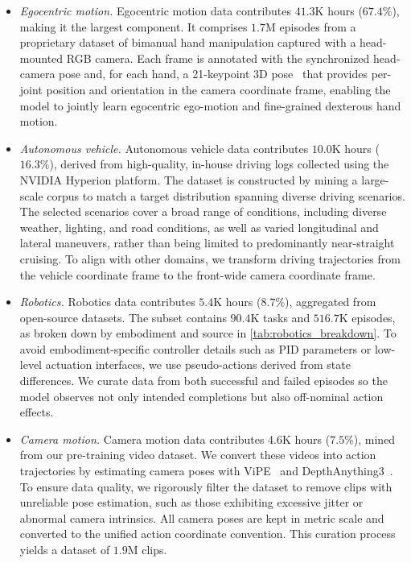 \begin{itemize}
  \item \textit{Egocentric motion.} Egocentric motion data contributes $41.3$K hours ($67.4\%$), making it the largest component. It comprises $1.7$M episodes from a proprietary dataset of bimanual hand manipulation captured with a head-mounted RGB camera.   Each frame is annotated with the synchronized head-camera pose and, for each hand, a 21-keypoint 3D pose~\citep{zimmermann2017learning,simon2017hand} that provides per-joint position and orientation in the camera coordinate frame, enabling the model to jointly learn egocentric ego-motion and fine-grained dexterous hand motion.
  \item \textit{Autonomous vehicle.} Autonomous vehicle data contributes $10.0$K hours ($16.3\%$), derived from high-quality, in-house driving logs collected using the NVIDIA Hyperion platform. The dataset is constructed by mining a large-scale corpus to match a target distribution spanning diverse driving scenarios. The selected scenarios cover a broad range of conditions, including diverse weather, lighting, and road conditions, as well as varied longitudinal and lateral maneuvers, rather than being limited to predominantly near-straight cruising. To align with other domains, we transform driving trajectories from the vehicle coordinate frame to the front-wide camera coordinate frame.
  \item \textit{Robotics.} Robotics data contributes $5.4$K hours ($8.7\%$), aggregated from open-source datasets. The subset contains $90.4$K tasks and $516.7$K episodes, as broken down by embodiment and source in \cref{tab:robotics_breakdown}. To avoid embodiment-specific controller details such as PID parameters or low-level actuation interfaces, we use pseudo-actions derived from state differences. We curate data from both successful and failed episodes so the model observes not only intended completions but also off-nominal action effects.
  \item \textit{Camera motion.} Camera motion data contributes $4.6$K hours ($7.5\%$), mined from our pre-training video dataset. We convert these videos into action trajectories by estimating camera poses with ViPE~\citep{huang2025vipe} and DepthAnything3~\citep{lin2025depthanything3}. To ensure data quality, we rigorously filter the dataset to remove clips with unreliable pose estimation, such as those exhibiting excessive jitter or abnormal camera intrinsics. All camera poses are kept in metric scale and converted to the unified action coordinate convention.
  This curation process yields a dataset of $1.9$M clips.
\end{itemize}

